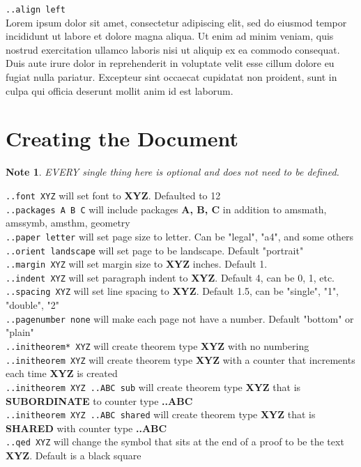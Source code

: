 \documentclass[12pt]{article}
\newtheorem{Note}[Lemma]{Note}
\begin{document}
\begin{flushleft}
\verb|..align left|\\
Lorem ipsum dolor sit amet, consectetur adipiscing elit, sed do eiusmod tempor incididunt ut labore et dolore magna aliqua. Ut enim ad minim veniam, quis nostrud exercitation ullamco laboris nisi ut aliquip ex ea commodo consequat. Duis aute irure dolor in reprehenderit in voluptate velit esse cillum dolore eu fugiat nulla pariatur. Excepteur sint occaecat cupidatat non proident, sunt in culpa qui officia deserunt mollit anim id est laborum.

\section{Creating the Document}

\begin{Note}
EVERY single thing here is optional and does not need to be defined.
\end{Note}

\verb|..font XYZ| will set font to \textbf{XYZ}. Defaulted to 12\\
\verb|..packages A B C| will include packages \textbf{A, B, C} in addition to amsmath, amssymb, amsthm, geometry \\
\verb|..paper letter| will set page size to letter. Can be "legal", "a4", and some others\\
\verb|..orient landscape| will set page to be landscape. Default "portrait"\\

\bigskip
\verb|..margin XYZ| will set margin size to \textbf{XYZ} inches. Default 1.\\
\verb|..indent XYZ| will set paragraph indent to \textbf{XYZ}. Default 4, can be 0, 1, etc.\\
\verb|..spacing XYZ| will set line spacing to \textbf{XYZ}. Default 1.5, can be "single", "1", "double", "2"\\
\verb|..pagenumber none| will make each page not have a number. Default "bottom" or "plain"\\

\bigskip
\verb|..initheorem* XYZ| will create theorem type \textbf{XYZ} with no numbering\\
\verb|..initheorem XYZ| will create theorem type \textbf{XYZ} with a counter that increments each time \textbf{XYZ} is created\\
\verb|..initheorem XYZ ..ABC sub| will create theorem type \textbf{XYZ} that is \textbf{SUBORDINATE} to counter type \textbf{..ABC}\\
\verb|..initheorem XYZ ..ABC shared| will create theorem type \textbf{XYZ} that is \textbf{SHARED} with counter type \textbf{..ABC}\\
\verb|..qed XYZ| will change the symbol that sits at the end of a proof to be the text \textbf{XYZ}. Default is a black square


\end{flushleft}
\end{document}
